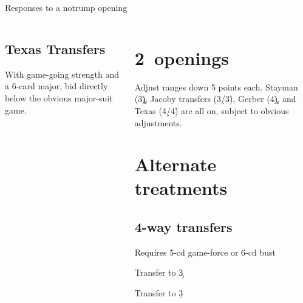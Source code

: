 \begin{sheet}{Responses to a notrump opening}
\begin{columns}
\begin{column}[span=5]
\subsection{Texas Transfers}
With game-going strength and a 6-card major, bid directly
below the obvious major-suit game.


\end{column}

\begin{column}[span=3]%
\section{2\nt\ openings}
Adjust ranges down 5 points each.  Stayman (3\c),
Jacoby transfers (3\d/3\h), Gerber (4\c), and Texas (4\d/4\h)
are all on, subject to obvious adjustments.
\section{Alternate treatments}
\subsection{4-way transfers}
Requires 5-cd game-force or 6-cd bust
\strut\vskip-20pt\strut
\begin{description}\itemsep-4pt
\item[2\s]Transfer to 3\c
\item[2\nt]Transfer to 3\d
\end{description}

\end{column}
\end{columns}

\end{sheet}
